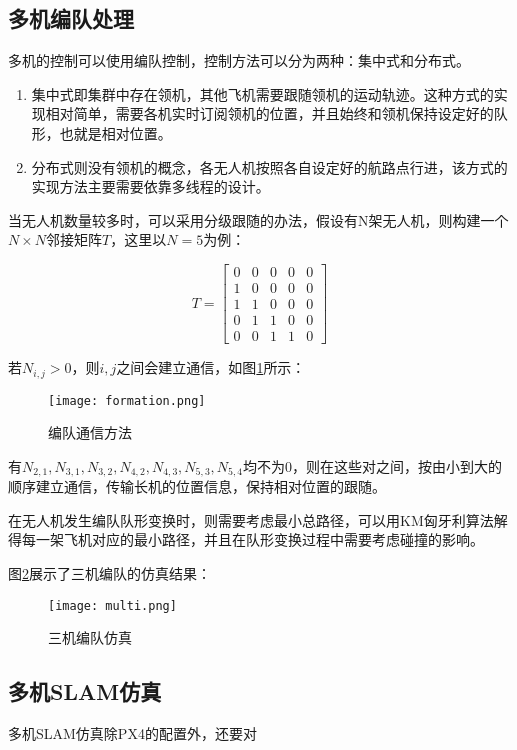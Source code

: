 \subsection{多机编队处理} \label{4.3.2}

多机的控制可以使用编队控制，控制方法可以分为两种：集中式和分布式。

\begin{enumerate}
	\item 集中式即集群中存在领机，其他飞机需要跟随领机的运动轨迹。这种方式的实现相对简单，需要各机实时订阅领机的位置，并且始终和领机保持设定好的队形，也就是相对位置。
	\item 分布式则没有领机的概念，各无人机按照各自设定好的航路点行进，该方式的实现方法主要需要依靠多线程的设计。
\end{enumerate}

当无人机数量较多时，可以采用分级跟随的办法，假设有N架无人机，则构建一个$N \times N$邻接矩阵$T$，这里以$N=5$为例：

$$
T=\begin{bmatrix}
0 & 0 & 0 & 0 & 0\\
1 & 0 & 0 & 0 & 0\\
1 & 1 & 0 & 0 & 0\\
0 & 1 & 1 & 0 & 0\\
0 & 0 & 1 & 1 & 0
\end{bmatrix}
$$

若$N_{i,j}>0$，则$i,j$之间会建立通信，如图\ref{fig4-7}所示：

\begin{figure}[!ht]
	\centering
	\texttt{[image: formation.png]}
	\caption{编队通信方法}
	\label{fig4-7}
\end{figure}

有$N_{2,1},N_{3,1},N_{3,2},N_{4,2},N_{4,3},N_{5,3},N_{5,4}$均不为0，则在这些对之间，按由小到大的顺序建立通信，传输长机的位置信息，保持相对位置的跟随。

在无人机发生编队队形变换时，则需要考虑最小总路径，可以用KM匈牙利算法解得每一架飞机对应的最小路径，并且在队形变换过程中需要考虑碰撞的影响。

图\ref{fig4-8}展示了三机编队的仿真结果：

\begin{figure}[!ht]
	\centering
	\texttt{[image: multi.png]}
	\caption{三机编队仿真}
	\label{fig4-8}
\end{figure}


\subsection{多机SLAM仿真} \label{4.3.3}

多机SLAM仿真除PX4的配置外，还要对




































